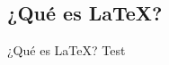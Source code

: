 \documentclass[../slides.tex]{subfiles}
\begin{document}
    \begin{frame}
    \tableofcontents[sections=\value{section}]
    \end{frame}

    \subsection{¿Qué es \LaTeX{}?}
        
    \begin{frame}{¿Qué es \LaTeX{}?}
        Test
    \end{frame}
\end{document}
